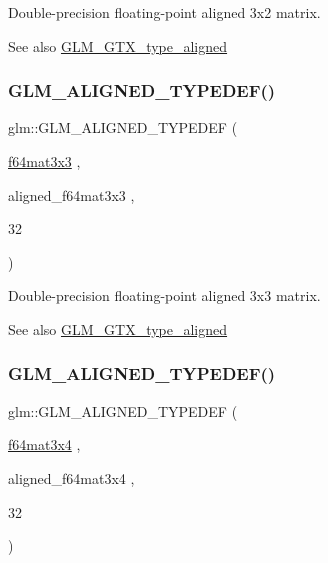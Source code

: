 Double-\/precision floating-\/point aligned 3x2 matrix. \begin{DoxySeeAlso}{See also}
\mbox{\hyperlink{group__gtx__type__aligned}{G\+L\+M\+\_\+\+G\+T\+X\+\_\+type\+\_\+aligned}} 
\end{DoxySeeAlso}
\mbox{\label{group__gtx__type__aligned_gad1dda32ed09f94bfcf0a7d8edfb6cf13}} 
\subsubsection{\texorpdfstring{GLM\_ALIGNED\_TYPEDEF()}{GLM\_ALIGNED\_TYPEDEF()}\hspace{0.1cm}{\footnotesize\ttfamily [200/209]}}
{\footnotesize\ttfamily glm\+::\+G\+L\+M\+\_\+\+A\+L\+I\+G\+N\+E\+D\+\_\+\+T\+Y\+P\+E\+D\+EF (\begin{DoxyParamCaption}\item[{\mbox{\hyperlink{group__gtc__type__precision_gab272e67eb87cc1e8233237480c2aa8d2}{f64mat3x3}}}]{,  }\item[{aligned\+\_\+f64mat3x3}]{,  }\item[{32}]{ }\end{DoxyParamCaption})}

Double-\/precision floating-\/point aligned 3x3 matrix. \begin{DoxySeeAlso}{See also}
\mbox{\hyperlink{group__gtx__type__aligned}{G\+L\+M\+\_\+\+G\+T\+X\+\_\+type\+\_\+aligned}} 
\end{DoxySeeAlso}
\mbox{\label{group__gtx__type__aligned_ga5875e0fa72f07e271e7931811cbbf31a}} 
\subsubsection{\texorpdfstring{GLM\_ALIGNED\_TYPEDEF()}{GLM\_ALIGNED\_TYPEDEF()}\hspace{0.1cm}{\footnotesize\ttfamily [201/209]}}
{\footnotesize\ttfamily glm\+::\+G\+L\+M\+\_\+\+A\+L\+I\+G\+N\+E\+D\+\_\+\+T\+Y\+P\+E\+D\+EF (\begin{DoxyParamCaption}\item[{\mbox{\hyperlink{group__gtc__type__precision_ga36436dae85fc187d4a20d68c4d660a10}{f64mat3x4}}}]{,  }\item[{aligned\+\_\+f64mat3x4}]{,  }\item[{32}]{ }\end{DoxyParamCaption})}

